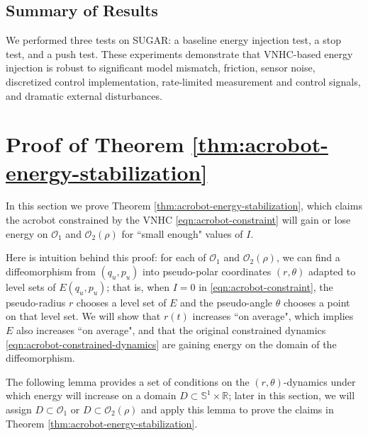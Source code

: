 \documentclass[journal,twoside,web, twocolumn,draftcls]{ieeecolor}
\newcommand*{\R}{\mathbb{R}}
\newcommand*{\Sone}{\mathbb{S}^1}
\newcommand*{\SxR}{\Sone \times \R}
\begin{document}
\subsection{Summary of Results} 
We performed three tests on SUGAR: a baseline energy injection test,
a stop test, and a push test.
These experiments demonstrate that VNHC-based energy injection is robust to
significant model mismatch, friction, sensor noise, discretized control
implementation, rate-limited measurement and control signals, and dramatic
external disturbances.

\section{Proof of Theorem \ref{thm:acrobot-energy-stabilization}}\label{sec:proof}
In this section we prove Theorem \ref{thm:acrobot-energy-stabilization},
which claims the acrobot constrained by the VNHC \eqref{eqn:acrobot-constraint}
will gain or lose energy on \(\mathcal{O}_1\) and \(\mathcal{O}_2(\rho)\) for
``small enough" values of \(I\).

Here is intuition behind this proof:
for each of \(\mathcal{O}_1\) and \(\mathcal{O}_2(\rho)\),
we can find a diffeomorphism from \((q_u,p_u)\) into pseudo-polar
coordinates \((r,\theta)\) adapted to level sets of \(E(q_u,p_u)\);
that is, when \(I = 0\) in \eqref{eqn:acrobot-constraint}, the pseudo-radius
\(r\) chooses a level set of \(E\) and the pseudo-angle \(\theta\) chooses a
point on that level set.
We will show that \(r(t)\) increases ``on average", 
which implies \(E\) also increases ``on average",
and that the original constrained dynamics \eqref{eqn:acrobot-constrained-dynamics} 
are gaining energy on the domain of the diffeomorphism.

The following lemma provides a set of conditions on the \((r,\theta)\)-dynamics
under which energy will increase on a domain \(D \subset \SxR\); later in this section, we
will assign \(D \subset \mathcal{O}_1\) or \(D \subset \mathcal{O}_2(\rho)\)
and apply this lemma to prove the claims in Theorem
\ref{thm:acrobot-energy-stabilization}.
\end{document}
